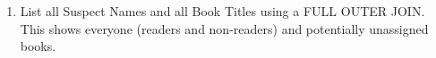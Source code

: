 \documentclass[12pt,a4paper]{article}
\begin{document}
\begin{enumerate}


    \item List all Suspect Names and all Book Titles using a FULL OUTER JOIN. This shows everyone (readers and non-readers) and potentially unassigned books.






\end{enumerate}
\end{document}
